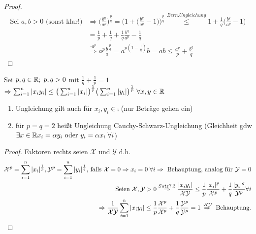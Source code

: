 \begin{proof} %
	\begin{align*}
	   \text{Sei } a,b > 0 \text{ (sonst klar!)}
       &\Rightarrow \big(\frac{b^q}{a^p}\big)^{\frac{p}{q}} = \big(1+\big(\frac{b^q}{a^p} -1\big)\big)^{\frac{p}{q}} \overset{Bern. Ungleichung}{\leq} 1+ \frac{1}{q}\big(\frac{b^q}{a^p} -1\big)\\ 
       &=\frac{1}{p}+\frac{1}{q}+\frac{1}{q}\frac{b^q}{a^p}-\frac{1}{q}\\
       &\overset{\cdot a^p}{\Rightarrow}a^p\frac{b}a^{\frac{p}{q}} = a^{p(1-\frac{1}{q})}b = ab \leq \frac{a^p}{p} + \frac{b^q}{q} 
	\end{align*}\QEDA
\end{proof}

\begin{satz}
    Sei $p,q \in \mathbb{R};\;p,q > 0$ mit $\frac{1}{q} + \frac{1}{p} = 1$\\
    $\Rightarrow \sum_{i=1}^{n} \vert x_i y_i\vert \leq \big( \sum_{i=1}^{n} \vert x_i \vert \big)^{\frac{1}{p}} \big( \sum_{i=1}^{n} \vert y_i \vert \big)^{\frac{1}{p}}\;\forall x,y \in \mathbb{R}$
\end{satz}

\begin{remark}
    \begin{enumerate}[label={\arabic*)}]
        \item Ungleichung gilt auch für $x_i,y_i \in \comp$ (nur Beträge gehen ein)
        \item für $p=q=2$ heißt Ungleichung Cauchy-Schwarz-Ungleichung (Gleichheit gdw $\exists x \in \mathbb{R} x_i = \alpha y_i \text{ oder } y_i = \alpha x_i\;\forall i$)
    \end{enumerate}
\end{remark}

\begin{proof}
	Faktoren rechts seien $\mathcal{X} \text{ und } \mathcal{Y}$ d.h.
    \begin{align*}
        \mathcal{X}^p = \sum_{i=1}^{n} \vert x_i \vert^{\frac{1}{p}}, \mathcal{Y}^p = \sum_{i=1}^{n} \vert y_i \vert^{\frac{1}{q}}\text{, falls } \mathcal{X}=0 \Rightarrow x_i = 0\;\forall i \Rightarrow \text{ Behauptung} \text{, analog für } \mathcal{Y} =0\\
        \text{Seien } \mathcal{X}, \mathcal{Y} > 0 \overset{Satz 7.3}{\Rightarrow} \frac{\vert x_i y_i \vert}{\mathcal{XY}} \leq \frac{1}{p}\frac{\vert x_i \vert^p}{\mathcal{X}^p}+\frac{1}{q}\frac{\vert y_i \vert^q}{\mathcal{Y}^p} \forall i\\
        \Rightarrow \frac{1}{\mathcal{XY}}\sum_{i=1}^{n}\vert x_i y_i \vert \leq \frac{1}{p}\frac{\mathcal{X}^p}{\mathcal{X}^p}+\frac{1}{q}\frac{\mathcal{Y}^p}{\mathcal{Y}^p} = 1 \overset{\cdot \mathcal{XY}}{\Rightarrow} \text{ Behauptung.}
    \end{align*}\QEDA
\end{proof}

